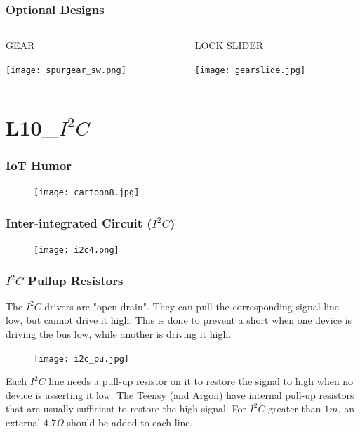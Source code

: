 \documentclass{beamer}
\begin{document}
\begin{frame}\frametitle{Optional Designs}
\begin{columns}
\begin{column}{5cm}
\begin{center}
GEAR

\vspace{0.25cm}

\texttt{[image: spurgear\_sw.png]}

\vspace{0.1cm}

\end{center}
\end{column}
\begin{column}{5cm}
\begin{center}

LOCK SLIDER

\vspace{0.25cm}

\texttt{[image: gearslide.jpg]}

\end{center}
\end{column}
\end{columns}
\end{frame}

\section{L10\_$I^2C$}

\begin{frame}\frametitle{IoT Humor}
\begin{figure}[h]
	\texttt{[image: cartoon8.jpg]}
\end{figure}
\end{frame}

\begin{frame}\frametitle{Inter-integrated Circuit ($I^{2}C$)}
\begin{figure}[h]
	\texttt{[image: i2c4.png]}
\end{figure}
\end{frame}

\begin{frame}\frametitle{$I^{2}C$ Pullup Resistors}
The $I^2C$  drivers are "open drain". They can pull the corresponding signal line low, but cannot drive it high. This is done to prevent a short when one device is driving the bus low, while another is driving it high. 
\begin{figure}[h]
	\texttt{[image: i2c\_pu.jpg]}
\end{figure}
Each $I^2C$ line needs a pull-up resistor on it to restore the signal to high when no device is asserting it low. The Teensy (and Argon) have internal pull-up resistors that are usually sufficient to restore the high signal. For $I^2C$ greater than $1m$, an external $4.7 \Omega$ should be added to each line. 
\end{frame}
\end{document}
